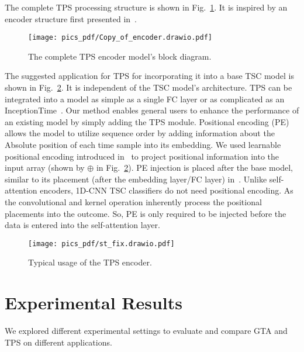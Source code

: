 \documentclass[journal]{IEEEtran}
\begin{document}
The complete TPS processing structure is shown in Fig.~\ref{fig:enc}. It is inspired by an encoder structure first presented in~\cite{vaswani2017attention}. 
\begin{figure}[!t]
\centering
\texttt{[image: pics\_pdf/Copy\_of\_encoder.drawio.pdf]}
\caption{The complete TPS encoder model's block diagram.}
\label{fig:enc}
\end{figure}
The suggested application for TPS for incorporating it into a base TSC model is shown in Fig.~\ref{fig:st}. It is independent of the TSC model's architecture. TPS can be integrated into a model as simple as a single FC layer or as complicated as an InceptionTime~\cite{fawaz2020inceptiontime}. Our method enables general users to enhance the performance of an existing model by simply adding the TPS module. Positional encoding (PE) allows the model to utilize sequence order by adding information about the Absolute position of each time sample into its embedding. We used learnable positional encoding introduced in~\cite{gehring2017convolutional} to project positional information into the input array (shown by $\oplus$ in Fig.~\ref{fig:st}). PE injection is placed after the base model, similar to its placement (after the embedding layer/FC layer) in~\cite{ vaswani2017attention}. Unlike self-attention encoders, 1D-CNN TSC classifiers do not need positional encoding. As the convolutional and kernel operation inherently process the positional placements into the outcome. So, PE is only required to be injected before the data is entered into the self-attention layer.
\begin{figure}[!t]
\centering
\texttt{[image: pics\_pdf/st\_fix.drawio.pdf]}
\caption{Typical usage of the TPS encoder.}
\label{fig:st}
\end{figure}

\section{Experimental Results}
We explored different experimental settings to evaluate and compare GTA and TPS on different applications. 
\end{document}
